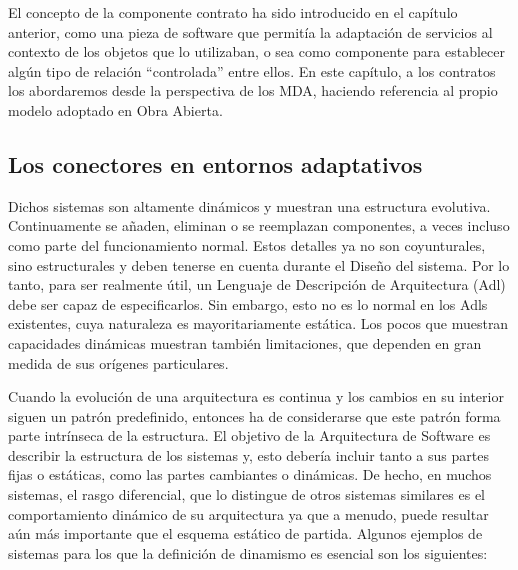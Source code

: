 El concepto de la componente contrato ha sido introducido en el capítulo
anterior, como una pieza de software que permitía la adaptación de servicios al
contexto de los objetos que lo utilizaban, o sea como componente para establecer
algún tipo de relación “controlada” entre ellos. En este capítulo, a los
contratos los abordaremos desde la perspectiva de los MDA, haciendo referencia
al propio modelo adoptado en Obra Abierta.


\subsection{Los conectores en entornos adaptativos}



Dichos sistemas son altamente dinámicos y muestran una estructura evolutiva.
Continuamente se añaden, eliminan o se reemplazan componentes, a veces incluso
como parte del funcionamiento normal. Estos detalles ya no son coyunturales,
sino estructurales y deben tenerse en cuenta durante el Diseño del sistema.
Por lo tanto, para ser realmente útil, un Lenguaje de Descripción de Arquitectura
(Adl) debe ser capaz de especificarlos. Sin embargo, esto no es lo normal en los
Adls existentes, cuya naturaleza es mayoritariamente estática. Los pocos que
muestran capacidades dinámicas muestran también limitaciones, que dependen en
gran medida de sus orígenes particulares.

Cuando la evolución de una arquitectura es continua y los cambios en su
interior siguen un patrón predefinido, entonces ha de considerarse que este
patrón forma parte intrínseca de la estructura. El objetivo de la Arquitectura
de Software es describir la estructura de los sistemas y, esto debería incluir
tanto a sus partes fijas o estáticas, como las partes cambiantes o dinámicas. De
hecho, en muchos sistemas, el rasgo diferencial, que lo distingue de otros
sistemas similares es el comportamiento dinámico de su arquitectura ya que a menudo,
puede resultar aún más importante que el esquema estático de partida. Algunos
ejemplos de sistemas para los que la definición de dinamismo es esencial son
los siguientes:

